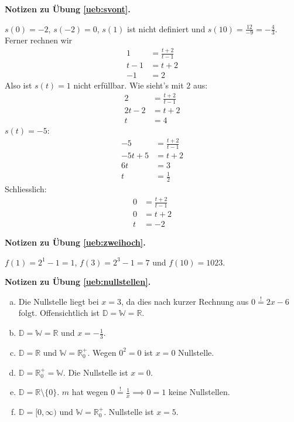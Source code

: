 \documentclass[%
11pt,%
twoside,%
titlepage,%
swissgerman,%
headsepline%
]{scrartcl}
\newcommand{\faReturnGray}{\textcolor{gray}{\faMailReply}} %
\theoremstyle{definition}
\theoremstyle{plain}
\newcommand{\concatueb}[1]{ueb:#1}%
\newcommand{\concatlsg}[1]{lsg:#1}%
\newenvironment{lsg}[1]{%
    \par\noindent\textbf{Notizen zu Übung \ref{\concatueb{#1}}.}%
    \label{\concatlsg{#1}} %
    \hfill\hyperref[\concatueb{#1}]{\faReturnGray}\par %
}{%
    \par%
}
\begin{document}
\begin{lsg}{svont}
	$s(0)=-2$, $s(-2)=0$, $s(1)$ ist nicht definiert und $s(10)=\frac{12}{-9}=-\frac{4}{3}$. Ferner rechnen wir
	\begin{align*}
		1 &= \frac{t+2}{t-1}\tag{$\cdot(t-1)$}\\
		t-1 &= t+2\tag{$-t$}\\
		-1 &= 2
	\end{align*}
	Also ist $s(t)=1$ nicht erf\"ullbar. Wie sieht's mit $2$ aus:
	\begin{align*}
		2 &= \frac{t+2}{t-1}\tag{$\cdot(t-1)$}\\
		2t-2 &= t+2\tag{$-t+2$}\\
		t &= 4
	\end{align*}
	$s(t)=-5:$
	\begin{align*}
		-5 &= \frac{t+2}{t-1}\tag{$\cdot(t-1)$}\\
		-5t+5 &= t+2\tag{$+5t-2$}\\
		6t &= 3\tag{$\div6$}\\
		t &= \frac{1}{2}
	\end{align*}
	Schliesslich:
	\begin{align*}
		0 &= \frac{t+2}{t-1}\tag{$\cdot(t-1)$}\\
		0 &= t+2\tag{$-2$}\\
		t &= -2
	\end{align*}
\end{lsg}
\begin{lsg}{zweihoch}
	$f(1)=2^{1}-1=1$, $f(3)=2^{3}-1=7$ und $f(10)=1023$.
\end{lsg}
\begin{lsg}{nullstellen}
	\begin{enumerate}[a)]
		\item Die Nullstelle liegt bei $x=3$, da dies nach kurzer Rechnung aus $0\stackrel{!}{=}2x-6$ folgt. Offensichtlich ist $\mathbb{D}=\mathbb{W}=\mathbb{R}$.
		\item $\mathbb{D}=\mathbb{W}=\mathbb{R}$ und $x=-\frac{1}{3}$.
		\item $\mathbb{D}=\mathbb{R}$ und $\mathbb{W}=\mathbb{R}^{+}_{0}$. Wegen $0^{2}=0$ ist $x=0$ Nullstelle.
		\item $\mathbb{D}=\mathbb{R}^{+}_{0}=\mathbb{W}$. Die Nullstelle ist $x=0$.
		\item $\mathbb{D}=\mathbb{R}\setminus\{0\}$. $m$ hat wegen $0\stackrel{!}{=}\frac{1}{x}\implies0=1$ keine Nullstellen.
		\item $\mathbb{D}=[0,\infty)$ und $\mathbb{W}=\mathbb{R}^{+}_{0}$. Nullstelle ist $x=5$.
	\end{enumerate}
\end{lsg}
\end{document}
